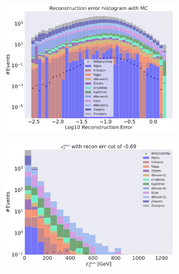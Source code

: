 \begin{figure}[H]
    \centering
    \begin{subfigure}{.49\textwidth}
        \includegraphics[width=\textwidth]{Figures/VAE_testing/small/3lep/b_data_recon_big_rm3_feats_sig_800p0p050p.pdf}
        \caption{ }
        \label{fig:VAE_3lep_small_800_2}
    \end{subfigure}
    \hfill
    \begin{subfigure}{.49\textwidth}
        \includegraphics[width=\textwidth]{Figures/VAE_testing/small/3lep/b_data_recon_big_rm3_feats_sig_800p0p050p_etmiss_recon_errcut_-0.69.pdf}
        \caption{}
        \label{fig:VAE_3lep_small_etmiss_800_2}
    \end{subfigure}

\end{figure}
